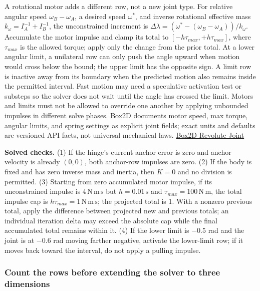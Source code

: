 A rotational motor adds a different row, not a new joint type. For relative angular speed \(\omega_B-\omega_A\), a desired speed \(\omega^*\), and inverse rotational effective mass \(k_\omega=I_A^{-1}+I_B^{-1}\), the unconstrained increment is \(\Delta\lambda=(\omega^*-(\omega_B-\omega_A))/k_\omega\). Accumulate the motor impulse and clamp its total to \([-h\tau_{max},+h\tau_{max}]\), where \(\tau_{max}\) is the allowed torque; apply only the change from the prior total. At a lower angular limit, a unilateral row can only push the angle upward when motion would cross below the bound; the upper limit has the opposite sign. A limit row is inactive away from its boundary when the predicted motion also remains inside the permitted interval. Fast motion may need a speculative activation test or substeps so the solver does not wait until the angle has crossed the limit. Motors and limits must not be allowed to override one another by applying unbounded impulses in different solve phases. Box2D documents motor speed, max torque, angular limits, and spring settings as explicit joint fields; exact units and defaults are versioned API facts, not universal mechanical laws. \href{https://box2d.org/documentation/group__revolute__joint.html}{Box2D Revolute Joint}

\textbf{Solved checks.} (1) If the hinge's current anchor error is zero and anchor velocity is already \((0,0)\), both anchor-row impulses are zero. (2) If the body is fixed and has zero inverse mass and inertia, then \(K=0\) and no division is permitted. (3) Starting from zero accumulated motor impulse, if its unconstrained impulse is \(4\,\mathrm{N\,m\,s}\) but \(h=0.01\,\mathrm s\) and \(\tau_{max}=100\,\mathrm{N\,m}\), the total impulse cap is \(h\tau_{max}=1\,\mathrm{N\,m\,s}\); the projected total is 1. With a nonzero previous total, apply the difference between projected new and previous totals; an individual iteration delta may exceed the absolute cap while the final accumulated total remains within it. (4) If the lower limit is \(-0.5\) rad and the joint is at \(-0.6\) rad moving farther negative, activate the lower-limit row; if it moves back toward the interval, do not apply a pulling impulse.

\subsubsection{Count the rows before extending the solver to three dimensions}\label{06-engine-ii-ch033-count-the-rows-before-extending-the-solver-to-three-dimensions}

